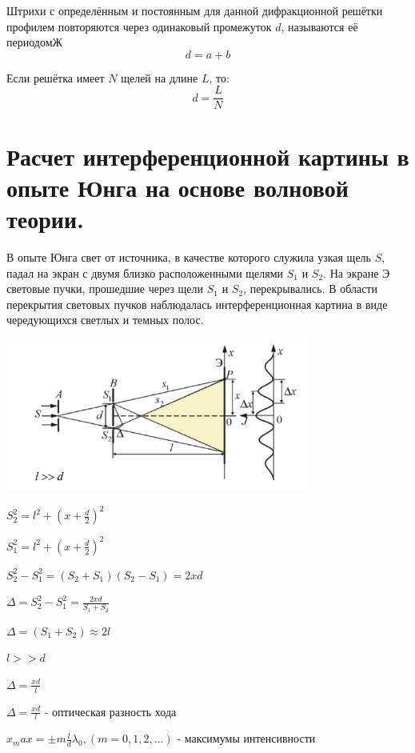\documentclass[12pt]{report}
\begin{document}
Штрихи с определённым и постоянным для данной дифракционной решётки профилем повторяются через одинаковый промежуток $d$, называются её периодомЖ
\[
    d = a + b
\]

Если решётка имеет $N$ щелей на длине $L$, то:
\[
    d = \dfrac{L}{N}
\]


\section{Расчет интерференционной картины в опыте Юнга на основе волновой теории.}
В опыте Юнга свет от источника, в качестве которого служила узкая щель $S$, падал на экран с двумя близко расположенными щелями $S_1$ и $S_2$. На экране Э световые пучки, прошедшие через щели $S_1$ и $S_2$, перекрывались.  В области перекрытия световых пучков наблюдалась интерференционная картина в виде чередующихся светлых и темных полос.

\begin{center}
    \includegraphics[width=100mm]{graphics/07.png}
\end{center}
\begin{center}
    $S^2 _2 = l^2 + (x + \frac{d}{2})^2 $
\end{center}
\begin{center}
    $S^2 _1 = l^2 + (x + \frac{d}{2})^2 $
\end{center}
\begin{center}
    $S^2 _2 - S^2 _1 = (S_2 + S_1)(S_2 - S_1) = 2xd $
\end{center}
\begin{center}
    $\Delta = S^2 _2 - S^2 _1 = \frac{2xd}{S_1 + S_2}$
\end{center}
\begin{center}
    $\Delta = (S_1 + S_2) ≈ 2l$
\end{center}
\begin{center}
    $l >> d$
\end{center}
\begin{center}
    $\Delta = \frac{xd}{l}$
\end{center}
\begin{center}
    $\Delta = \frac{xd}{l}$ - оптическая разность хода
\end{center}
\begin{center}
    $x_max = \pm m \frac{l}{d} \lambda_0, (m = 0, 1, 2, ...) $ - максимумы интенсивности
\end{center}
\end{document}
